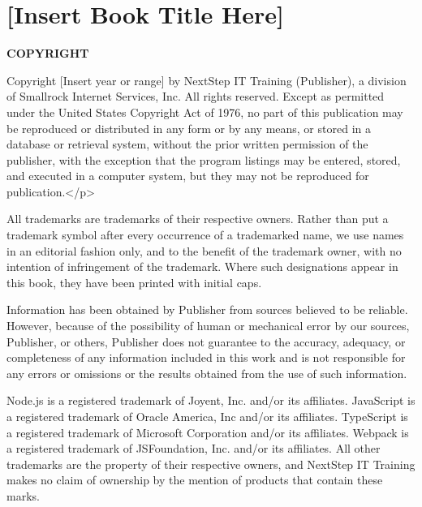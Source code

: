 \documentclass[../workbook]{subfiles}
\begin{document}
\section*{[Insert Book Title Here]}

\parbox{\textwidth}{

    \footnotesize
    \raggedright
    \setlength{\parskip}{1.25em}

    \par{
        \textbf{COPYRIGHT}
    }

    \par{
        Copyright [Insert year or range] by NextStep IT Training (Publisher), a division of Smallrock Internet Services, Inc.
        All rights reserved. Except as permitted under the United States Copyright Act of 1976, no part of this publication may be reproduced or distributed in any form or by any means, or stored in a database or retrieval system, without the prior written permission of the publisher, with the exception that the program listings may be entered, stored, and executed in a computer system, but they may not be reproduced for publication.</p>
    }
    

    \par{
        All trademarks are trademarks of their respective owners.
        Rather than put a trademark symbol after every occurrence of a trademarked name, we use names in an editorial fashion only, and to the benefit of the trademark owner, with no intention of infringement of the trademark.
        Where such designations appear in this book, they have been printed with initial caps.
    }

    \par{
        Information has been obtained by Publisher from sources believed to be reliable.
        However, because of the possibility of human or mechanical error by our sources, Publisher, or others, Publisher does not guarantee to the accuracy, adequacy, or completeness of any information included in this work and is not responsible for any errors or omissions or the results obtained from the use of such information.
    }

    \par{
        Node.js is a registered trademark of Joyent, Inc. and/or its affiliates.
        JavaScript is a registered trademark of Oracle America, Inc and/or its affiliates.
        TypeScript is a registered trademark of Microsoft Corporation and/or its affiliates.
        Webpack is a registered trademark of JSFoundation, Inc. and/or its affiliates.
        All other trademarks are the property of their respective owners, and NextStep IT Training makes no claim of ownership by the mention of products that contain these marks.
    }

}
\end{document}
